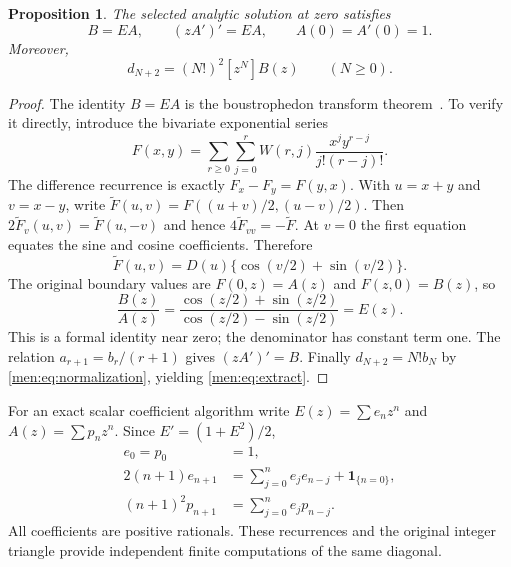 \documentclass[11pt,letterpaper]{article}
\newtheorem{proposition}[theorem]{Proposition}
\theoremstyle{remark}\newtheorem{remark}[theorem]{Remark}
\newcommand{\one}{\mathbf 1}\newcommand{\fall}[2]{#1^{\underline{#2}}}
\begin{document}
\begin{proposition}\label{men:prop:ode}
The selected analytic solution at zero satisfies
\begin{equation}\label{men:eq:ode}
 B=EA,\qquad (zA')'=EA,\qquad A(0)=A'(0)=1.
\end{equation}
Moreover,
\begin{equation}\label{men:eq:extract}
 d_{N+2}=(N!)^2[z^N]B(z)\qquad(N\ge0).
\end{equation}
\end{proposition}
\begin{proof}
The identity $B=EA$ is the boustrophedon transform theorem~\cite[Theorem 1]{msy}. To verify it directly, introduce the bivariate exponential series
\[
 F(x,y)=\sum_{r\ge0}\sum_{j=0}^r W(r,j)\frac{x^j y^{r-j}}{j!(r-j)!}.
\]
The difference recurrence is exactly $F_x-F_y=F(y,x)$. With $u=x+y$ and $v=x-y$, write $\widetilde F(u,v)=F((u+v)/2,(u-v)/2)$. Then $2\widetilde F_v(u,v)=\widetilde F(u,-v)$ and hence $4\widetilde F_{vv}=-\widetilde F$. At $v=0$ the first equation equates the sine and cosine coefficients. Therefore
\[
 \widetilde F(u,v)=D(u)\{\cos(v/2)+\sin(v/2)\}.
\]
The original boundary values are $F(0,z)=A(z)$ and $F(z,0)=B(z)$, so
\[
 \frac{B(z)}{A(z)}=
 \frac{\cos(z/2)+\sin(z/2)}{\cos(z/2)-\sin(z/2)}=E(z).
\]
This is a formal identity near zero; the denominator has constant term one. The relation $a_{r+1}=b_r/(r+1)$ gives $(zA')'=B$. Finally $d_{N+2}=N!b_N$ by \eqref{men:eq:normalization}, yielding \eqref{men:eq:extract}.
\end{proof}

For an exact scalar coefficient algorithm write $E(z)=\sum e_nz^n$ and $A(z)=\sum p_nz^n$. Since $E'=(1+E^2)/2$,
\begin{equation}\label{men:eq:taylor}
 \begin{split}
 e_0=p_0&=1,\\
 2(n+1)e_{n+1}&=\sum_{j=0}^n e_je_{n-j}+\one_{\{n=0\}},\\
 (n+1)^2p_{n+1}&=\sum_{j=0}^n e_jp_{n-j}.
 \end{split}
\end{equation}
All coefficients are positive rationals. These recurrences and the original integer triangle provide independent finite computations of the same diagonal.
\end{document}
